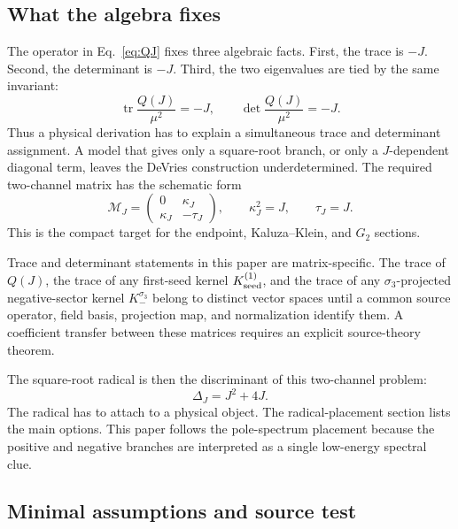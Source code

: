 \subsection{What the algebra fixes}

The operator in Eq.~\eqref{eq:QJ} fixes three algebraic facts.  First, the trace is \(-J\).  Second, the determinant is \(-J\).  Third, the two eigenvalues are tied by the same invariant:
\begin{equation}
  \operatorname{tr}\frac{Q(J)}{\mu^2}=-J,\qquad
  \det\frac{Q(J)}{\mu^2}=-J.
  \label{eq:trace-det-fixed}
\end{equation}
Thus a physical derivation has to explain a simultaneous trace and determinant assignment.  A model that gives only a square-root branch, or only a \(J\)-dependent diagonal term, leaves the DeVries construction underdetermined.  The required two-channel matrix has the schematic form
\begin{equation}
  \mathcal M_J=
  \begin{pmatrix}
  0 & \kappa_J\\
  \kappa_J & -\tau_J
  \end{pmatrix},
  \qquad
  \kappa_J^2=J,\qquad \tau_J=J.
  \label{eq:minimal-two-channel}
\end{equation}
This is the compact target for the endpoint, Kaluza--Klein, and \(G_2\) sections.

Trace and determinant statements in this paper are matrix-specific.  The trace
of \(Q(J)\), the trace of any first-seed kernel \(K_{\rm seed}^{(1)}\), and the
trace of any \(\sigma_3\)-projected negative-sector kernel \(K_-^{\sigma_3}\)
belong to distinct vector spaces until a common source operator, field basis,
projection map, and normalization identify them.  A coefficient transfer
between these matrices requires an explicit source-theory theorem.

The square-root radical is then the discriminant of this two-channel problem:
\begin{equation}
  \Delta_J=J^2+4J.
  \label{eq:discriminant}
\end{equation}
The radical has to attach to a physical object.  The radical-placement section lists the main options.  This paper follows the pole-spectrum placement because the positive and negative branches are interpreted as a single low-energy spectral clue.

\subsection{Minimal assumptions and source test}

